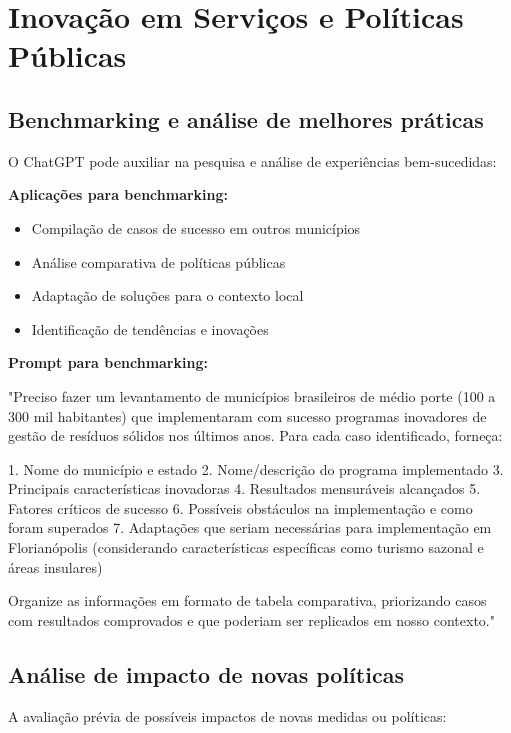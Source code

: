\documentclass[12pt,a4paper]{book}
\begin{document}
\section{Inovação em Serviços e Políticas Públicas}

\subsection{Benchmarking e análise de melhores práticas}

O ChatGPT pode auxiliar na pesquisa e análise de experiências bem-sucedidas:

\textbf{Aplicações para benchmarking:}
\begin{itemize}
    \item Compilação de casos de sucesso em outros municípios
    \item Análise comparativa de políticas públicas
    \item Adaptação de soluções para o contexto local
    \item Identificação de tendências e inovações
\end{itemize}

\begin{tcolorbox}[exemplo]
\textbf{Prompt para benchmarking:}

"Preciso fazer um levantamento de municípios brasileiros de médio porte (100 a 300 mil habitantes) que implementaram com sucesso programas inovadores de gestão de resíduos sólidos nos últimos anos. Para cada caso identificado, forneça:

1. Nome do município e estado
2. Nome/descrição do programa implementado
3. Principais características inovadoras
4. Resultados mensuráveis alcançados
5. Fatores críticos de sucesso
6. Possíveis obstáculos na implementação e como foram superados
7. Adaptações que seriam necessárias para implementação em Florianópolis (considerando características específicas como turismo sazonal e áreas insulares)

Organize as informações em formato de tabela comparativa, priorizando casos com resultados comprovados e que poderiam ser replicados em nosso contexto."
\end{tcolorbox}

\subsection{Análise de impacto de novas políticas}

A avaliação prévia de possíveis impactos de novas medidas ou políticas:
\end{document}

